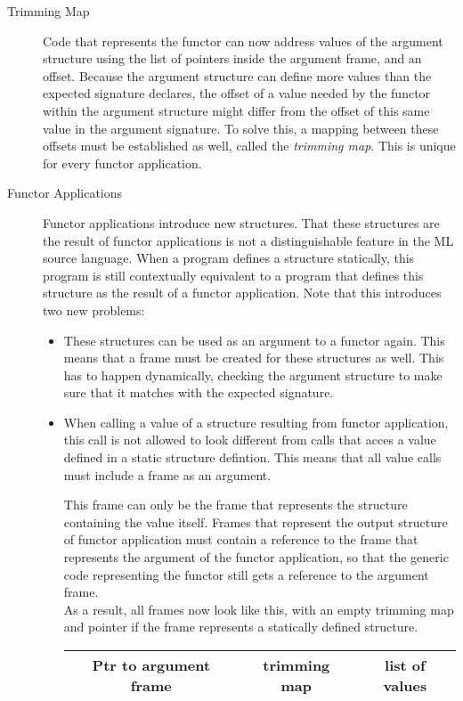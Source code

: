 \documentclass[11pt]{article}
\newcommand{\gray}{\cellcolor{lightgray}}
\begin{document}
\begin{description}
\item[Trimming Map]
Code that represents the functor can now address values of the argument structure using the list of pointers inside the argument frame, and an offset.
Because the argument structure can define more values than the expected signature declares, the offset of a value needed by the functor within the argument structure might differ from the offset of this same value in the argument signature.
To solve this, a mapping between these offsets must be established as well, called the \emph{trimming map}. This is unique for every functor application.

\item[Functor Applications]
Functor applications introduce new structures. 
That these structures are the result of functor applications is not a distinguishable feature in the ML source language.
When a program defines a structure statically, this program is still contextually equivalent to a program that defines this structure as the result of a functor application.
Note that this introduces two new problems:
\begin{itemize}
\item 
These structures can be used as an argument to a functor again. This means that a frame must be created for these structures as well.
This has to happen dynamically, checking the argument structure to make sure that it matches with the expected signature.

\item When calling a value of a structure resulting from functor application, this call is not allowed to look different from calls that acces a value defined in a static structure defintion.
This means that all value calls must include a frame as an argument.

This frame can only be the frame that represents the structure containing the value itself.
Frames that represent the output structure of functor application must contain a reference to the frame that represents the argument of the functor application, so that the generic code representing the functor still gets a reference to the argument frame.
\\[0.5em] %
As a result, all frames now look like this, with an empty trimming map and pointer if the frame represents a statically defined structure.

\begin{tabular}{|c c c|}
\hline
Ptr to argument frame & \gray trimming map &  list of values\\
\hline
\end{tabular}
\end{itemize}


\end{description}
\end{document}
